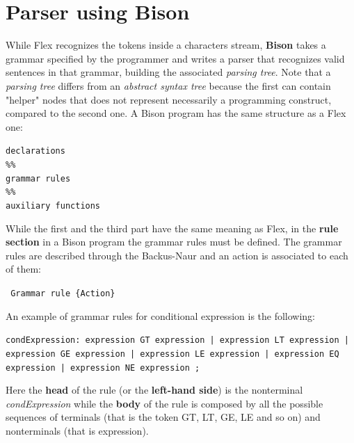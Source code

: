 \documentclass[a4paper,12pt,,titlepage,openright]{report}
\newcommand\tab[1][1cm]{\hspace*{#1}}
\begin{document}
\section{Parser using Bison}
While Flex recognizes the tokens inside a characters stream, \textbf{Bison} takes a grammar specified by the programmer and writes a parser that recognizes valid sentences in that grammar, building the associated \textit{parsing tree}.
Note that a \textit{parsing tree} differs from an \textit{abstract syntax tree} because the first can contain "helper" nodes that does not represent necessarily a programming construct, compared to the second one.
A Bison program has the same structure as a Flex one:
\begin{flushleft}
\texttt{declarations
\\
\%\% 
\\grammar rules
\\
\%\%
\\auxiliary functions }
\end{flushleft}
While the first and the third part have the same meaning as Flex, in the \textbf{rule section} in a Bison program the grammar rules must be defined. The grammar rules are described through the Backus-Naur and an action is associated to each of them:

\begin{flushleft}
\texttt{ Grammar rule		\tab\{Action\} }
\end{flushleft}

An example of grammar rules for conditional expression is the following:

\begin{flushleft}
\texttt{condExpression:
\newline\tab expression GT expression       
\newline\tab  | expression LT expression       
\newline\tab  | expression GE expression        
\newline\tab | expression LE expression                                          
\newline\tab | expression EQ expression        
\newline\tab | expression NE expression        
\newline\tab ;
}
\end{flushleft}
Here the \textbf{head} of the rule (or the \textbf{left-hand side}) is the nonterminal \textit{condExpression} while the \textbf{body} of the rule is composed by all the possible sequences of terminals (that is the token GT, LT, GE, LE and so on) and nonterminals (that is expression).
\end{document}
